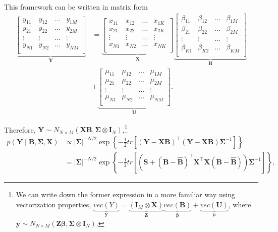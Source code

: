 This framework can be written in matrix form
\begin{align*}
	\underbrace{
		\begin{bmatrix}
			y_{11} & y_{12} & \dots & y_{1M}\\
			y_{21} & y_{22} & \dots & y_{2M}\\
			\vdots & \vdots & \dots & \vdots\\
			y_{N1} & y_{N2} & \dots & y_{NM}\\
	\end{bmatrix}}_{\bm{Y}}
	&=
	\underbrace{\begin{bmatrix}
			x_{11} & x_{12} & \dots & x_{1K}\\
			x_{21} & x_{22} & \dots & x_{2K}\\
			\vdots & \vdots & \dots & \vdots\\
			x_{N1} & x_{N2} & \dots & x_{NK}\\
	\end{bmatrix}}_{\bm{X}}
	\underbrace{
		\begin{bmatrix}
			\beta_{11} & \beta_{12} & \dots & \beta_{1M}\\
			\beta_{21} & \beta_{22} & \dots & \beta_{2M}\\
			\vdots & \vdots & \dots & \vdots\\
			\beta_{K1} & \beta_{K2} & \dots & \beta_{KM}\\
	\end{bmatrix}}_{\bm{B}}\\
	&+
	\underbrace{\begin{bmatrix}
			\mu_{11} & \mu_{12} & \dots & \mu_{1M}\\
			\mu_{21} & \mu_{22} & \dots & \mu_{2M}\\
			\vdots & \vdots & \dots & \vdots\\
			\mu_{N1} & \mu_{N2} & \dots & \mu_{NM}\\
	\end{bmatrix}}_{\bm{U}}.
\end{align*}

Therefore, ${\bm{Y}}\sim N_{N\times M}({\bm{X}}{\bm{B}},\bm{\Sigma}\otimes {\bm{I}}_N)$,\footnote{We can write down the former expression in a more familiar way using vectorization properties,
$\underbrace{vec(Y)}_{\bm{y}}=\underbrace{({\bm{I}}_M\otimes {\bm{X}})}_{{\bm{Z}}}\underbrace{vec({\bm{B}})}_{\bm{\beta}}+\underbrace{vec({\bm{U}})}_{\mu}$, where ${\bm{y}}\sim N_{N\times M}({\bm{Z}}\bm{\beta},\bm{\Sigma}\otimes {\bm{I}}_N)$.}
\begin{align*}
	p({\bm{Y}}\mid  {\bm{B}},{\bm{\Sigma}}, {\bm{X}})&\propto |{{\bm \Sigma}}|^{-N/2}\exp\left\lbrace -\frac{1}{2}tr\left[({\bm{Y}}-{\bm{X}}{\bm{B}})^{\top}({\bm{Y}}-{\bm{X}}{\bm{B}}){{\bm \Sigma}}^{-1}\right]\right\rbrace
	\\
	&=|{{\bm \Sigma}}|^{-N/2}\exp\left\lbrace -\frac{1}{2}tr\left[\left({\bm{S}}+({\bm{B}}-\widehat{\bm{B}})^{\top}{\bm{X}}^{\top}{\bm{X}}({\bm{B}}-\widehat{\bm{B}})\right){{\bm \Sigma}}^{-1}\right]\right\rbrace,
\end{align*}

